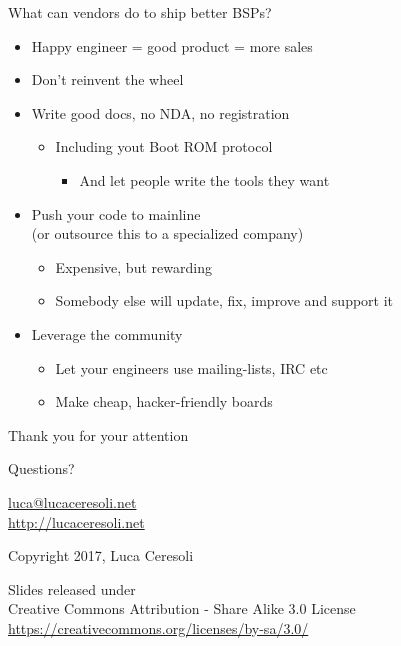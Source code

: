 \documentclass[xetex,table]{beamer}
\begin{document}
\begin{frame}{What can vendors do to ship better BSPs?}
  \begin{itemize}
  \item Happy engineer = good product = more sales
  \item Don't reinvent the wheel
  \item Write good docs, no NDA, no registration
    \begin{itemize}
    \item Including yout Boot ROM protocol
      \begin{itemize}
      \item And let people write the tools they want
      \end{itemize}
    \end{itemize}
  \item Push your code to mainline\\
    {\small (or outsource this to a specialized company)}
    \begin{itemize}
    \item Expensive, but rewarding
    \item Somebody else will update, fix, improve and support it
    \end{itemize}
  \item Leverage the community
    \begin{itemize}
    \item Let your engineers use mailing-lists, IRC etc
    \item Make cheap, hacker-friendly boards
    \end{itemize}
  \end{itemize}
\end{frame}

\begin{frame}
  \begin{center}
    Thank you for your attention

    \vspace{0.15\textheight}

    {\Huge Questions?}

    \vspace{0.15\textheight}

    \href{mailto:luca@lucaceresoli.net}{luca@lucaceresoli.net}\\
    \url{http://lucaceresoli.net}

    \textcopyright{} Copyright 2017, Luca Ceresoli\\

    \vspace{0.05\textheight}

    \tiny
    Slides released under\\
    Creative Commons Attribution - Share Alike 3.0 License \\
    \url{https://creativecommons.org/licenses/by-sa/3.0/} \\
\end{center}
\end{frame}
\end{document}
